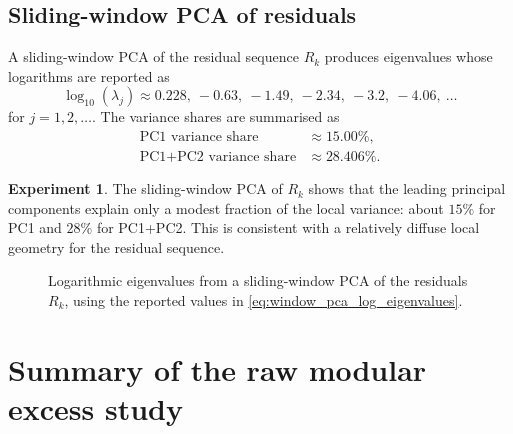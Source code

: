 \documentclass[11pt]{amsart}
\numberwithin{equation}{section}
\theoremstyle{plain}
\theoremstyle{definition}
\newtheorem{experiment}[theorem]{Experiment}
\theoremstyle{remark}
\begin{document}
\subsection{Sliding-window PCA of residuals}
\label{subsec:sliding_window_pca}

A sliding-window PCA of the residual sequence $R_k$
produces eigenvalues whose logarithms are reported as
\begin{equation}
\log_{10}(\lambda_j) \approx
0.228,\ -0.63,\ -1.49,\ -2.34,\ -3.2,\ -4.06,\ \dots
\label{eq:window_pca_log_eigenvalues}
\end{equation}
for $j=1,2,\dots$.
The variance shares are summarised as
\begin{align}
\text{PC1 variance share} &\approx 15.00\%,
\label{eq:window_PC1_share}\\
\text{PC1+PC2 variance share} &\approx 28.406\%.
\label{eq:window_PC12_share}
\end{align}

\begin{experiment}
\label{exp:window_pca}
The sliding-window PCA of $R_k$ shows that the leading principal
components explain only a modest fraction of the local variance:
about $15\%$ for PC1 and $28\%$ for PC1+PC2.
This is consistent with a relatively diffuse local geometry
for the residual sequence.
\end{experiment}

\begin{figure}[htbp]
\centering
{}
\caption{Logarithmic eigenvalues from a sliding-window PCA of the residuals
$R_k$, using the reported values in
\eqref{eq:window_pca_log_eigenvalues}.}
\label{fig:window_pca_eigenvalues}
\end{figure}

\section{Summary of the raw modular excess study}
\label{sec:modular_excess_summary}
\end{document}
